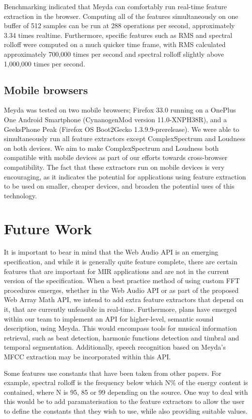 \documentclass{sig-alternate}
\begin{document}
Benchmarking indicated that Meyda can comfortably run real-time feature extraction in the browser. Computing all of the features simultaneously on one buffer of 512 samples can be run at 288 operations per second, approximately 3.34 times realtime. Furthermore, specific features such as RMS and spectral rolloff were computed on a much quicker time frame, with RMS calculated approximately 700,000 times per second and spectral rolloff slightly above 1,000,000 times per second.

\subsection{Mobile browsers}

Meyda was tested on two mobile browsers; Firefox 33.0 running on a OnePlus One Android Smartphone (CynanogenMod version 11.0-XNPH38R), and a GeeksPhone Peak (Firefox OS Boot2Gecko 1.3.9.9-prerelease). We were able to simultaneously run all feature extractors except ComplexSpectrum and Loudness on both devices. We aim to make ComplexSpectrum and Loudness both compatible with mobile devices as part of our efforts towards cross-browser compatibility. The fact that these extractors run on mobile devices is very encouraging, as it indicates the potential for applications using feature extraction to be used on smaller, cheaper devices, and broaden the potential uses of this technology.

\section{Future Work}
It is important to bear in mind that the Web Audio API is an emerging specification, and while it is generally quite feature complete, there are certain features that are important for MIR applications and are not in the current version of the specification. When a best practice method of using custom FFT procedures emerges, whether in the Web Audio API or as part of the proposed Web Array Math API, we intend to add extra feature extractors that depend on it, that are currently unfeasible in real-time. Furthermore, plans have emerged within our team to implement an API for higher-level, semantic sound description, using Meyda. This would encompass tools for musical information retrieval, such as beat detection, harmonic functions detection and timbral and temporal segmentation. Additionally, speech recognition based on Meyda's MFCC extraction may be incorporated within this API.

Some features use constants that have been taken from other papers. For example, spectral rolloff is the frequency below which N\% of the energy content is contained, where N is 95\cite{peeters2004large}, 85\cite{jAudio} or 99\cite{mathieu2010yaafe} depending on the source. One way to deal with this would be to add paramaterisation to the feature extractors to allow the user to define the constants that they wish to use, while also providing suitable values.
\end{document}
